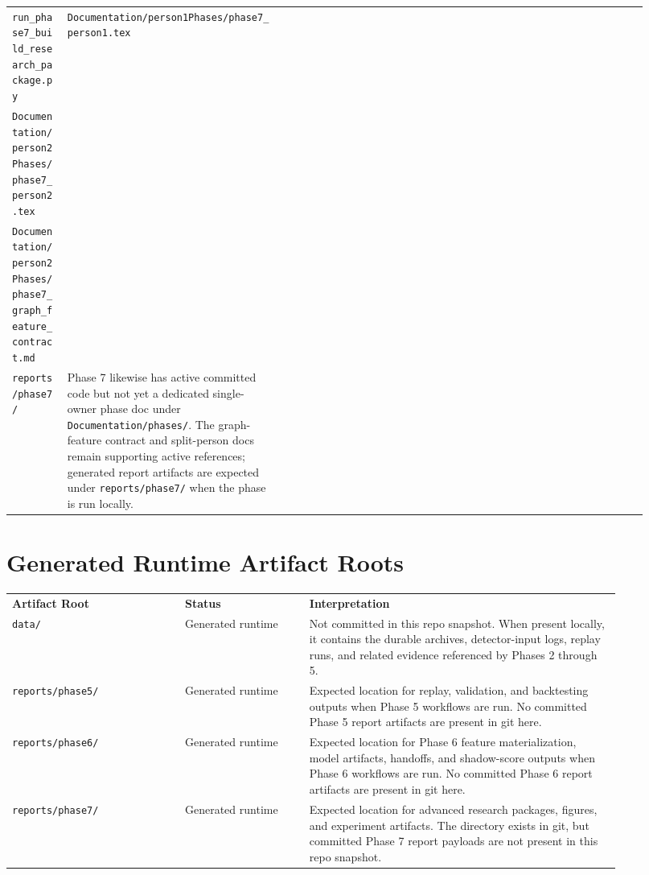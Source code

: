 \documentclass{article}
\begin{document}
\begin{longtable}{p{0.08\linewidth}p{0.31\linewidth}p{0.27\linewidth}p{0.26\linewidth}}
\texttt{run\_phase7\_build\_research\_package.py}
&
\texttt{Documentation/person1Phases/phase7\_person1.tex}\\
\texttt{Documentation/person2Phases/phase7\_person2.tex}\\
\texttt{Documentation/person2Phases/phase7\_graph\_feature\_contract.md}\\
\texttt{reports/phase7/}
&
Phase 7 likewise has active committed code but not yet a dedicated single-owner phase doc under \texttt{Documentation/phases/}. The graph-feature contract and split-person docs remain supporting active references; generated report artifacts are expected under \texttt{reports/phase7/} when the phase is run locally. \\
\end{longtable}

\section*{Generated Runtime Artifact Roots}
\begin{longtable}{p{0.25\linewidth}p{0.18\linewidth}p{0.45\linewidth}}
\textbf{Artifact Root} & \textbf{Status} & \textbf{Interpretation} \\
\texttt{data/} & Generated runtime & Not committed in this repo snapshot. When present locally, it contains the durable archives, detector-input logs, replay runs, and related evidence referenced by Phases 2 through 5. \\
\texttt{reports/phase5/} & Generated runtime & Expected location for replay, validation, and backtesting outputs when Phase 5 workflows are run. No committed Phase 5 report artifacts are present in git here. \\
\texttt{reports/phase6/} & Generated runtime & Expected location for Phase 6 feature materialization, model artifacts, handoffs, and shadow-score outputs when Phase 6 workflows are run. No committed Phase 6 report artifacts are present in git here. \\
\texttt{reports/phase7/} & Generated runtime & Expected location for advanced research packages, figures, and experiment artifacts. The directory exists in git, but committed Phase 7 report payloads are not present in this repo snapshot. \\
\end{longtable}
\end{document}
